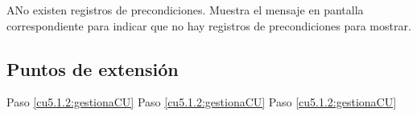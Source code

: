  \begin{UCtrayectoriaA}{A}{No existen registros de precondiciones.}
    \UCpaso[\UCsist] Muestra el mensaje  en pantalla correspondiente
    para indicar que no hay registros de precondiciones para mostrar.
 \end{UCtrayectoriaA}
 

\subsection{Puntos de extensión}

	{Paso \ref{cu5.1.2:gestionaCU}}
	{}
	{Paso \ref{cu5.1.2:gestionaCU}}
	{}
	{Paso \ref{cu5.1.2:gestionaCU}}
	{}
  